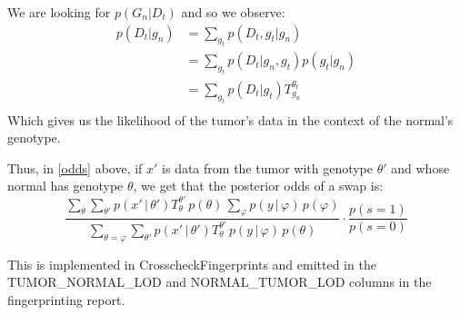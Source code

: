 \documentclass[12pt]{article}
\begin{document}
We are looking for $p(G_n|D_t)$ and so we observe:
\begin{align*}
p(D_t|g_n)&=\sum_{g_t}p(D_t,g_t|g_n)\\
&=\sum_{g_t}p(D_t|g_n,g_t)p(g_t|g_n)\\
&=\sum_{g_t}p(D_t|g_t) T^{g_t}_{g_n}\\
\end{align*}
Which gives us the likelihood of the tumor's data in the context of the normal's genotype.

Thus, in \eqref{odds} above, if $x'$ is data from the tumor with genotype $\theta'$ and whose normal has genotype $\theta$, we get that the posterior odds of a swap is:
\begin{equation}
\boxed{\frac{\sum_\theta \sum_{\theta'} p(x' \, | \, \theta')T_{\theta}^{\theta'} \, p(\theta) \, \sum_{\varphi} p(y \, | \, \varphi) \, p(\varphi)}{\sum_{\theta = \varphi}  \sum_{\theta'} p(x' \, | \, \theta')T_{\theta}^{\theta'} \, p(y \, | \, \varphi) \, p(\theta)} \cdot \frac{p(s=1)}{p(s=0)}}
\end{equation}

This is implemented in CrosscheckFingerprints and emitted in the TUMOR\_NORMAL\_LOD and NORMAL\_TUMOR\_LOD columns in the fingerprinting report.
\end{document}
